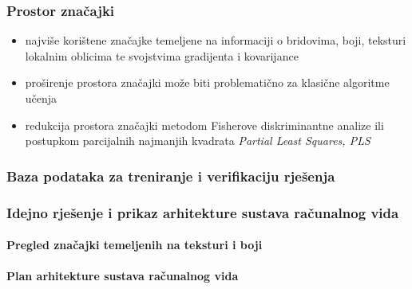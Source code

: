 \documentclass{beamer}
\begin{document}
\begin{frame}
\frametitle{Prostor značajki}
\begin{itemize}
\item najviše korištene značajke temeljene na informaciji o bridovima, boji, teksturi lokalnim oblicima te svojstvima gradijenta i kovarijance
\item proširenje prostora značajki može biti problematično za klasične algoritme učenja 
\item redukcija prostora značajki metodom Fisherove diskriminantne analize ili postupkom parcijalnih najmanjih kvadrata \emph{Partial Least Squares, PLS}
\end{itemize}
\end{frame}

\begin{frame}
\frametitle{Baza podataka za treniranje i verifikaciju rješenja}
\end{frame}

\begin{frame}
\frametitle{Idejno rješenje i prikaz arhitekture sustava računalnog vida}
\framesubtitle{Pregled značajki temeljenih na teksturi i boji}
\end{frame}

\begin{frame}
\framesubtitle{Plan arhitekture sustava računalnog vida}
\end{frame}
\end{document}
